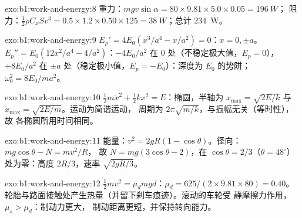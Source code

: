 \begin{solution}{exo:b1:work-and-energy:8}
重力：$mgv\sin\alpha = 80 \times 9.81 \times 5.0 \times 0.05 = \qty{196}{W}$；
阻力：$\tfrac12\rho C_xSv^3 = 0.5 \times 1.2 \times 0.50 \times 125 =
\qty{38}{W}$；总计 \qty{234}{W}。
\end{solution}

\begin{solution}{exo:b1:work-and-energy:9}
$E_p' = 4E_0(x^3/a^4 - x/a^2) = 0$：$x = 0, \pm a$。$E_p'' = E_0(12x^2/a^4 -
4/a^2)$：$-4E_0/a^2$ 在 $0$ 处（不稳定极大值，$E_p = 0$），$+8E_0/a^2$
在 $\pm a$ 处（稳定极小值，$E_p = -E_0$）：深度为 $E_0$ 的势阱；
$\omega_0^2 = 8E_0/ma^2$。
\end{solution}

\begin{solution}{exo:b1:work-and-energy:10}
$\tfrac12 m\dot x^2 + \tfrac12 kx^2 = E$：椭圆，半轴为 $x_{\max}
= \sqrt{2E/k}$ 与 $\dot x_{\max} = \sqrt{2E/m}$。运动为简谐运动，
周期为 $2\pi\sqrt{m/k}$，与振幅无关（等时性），故
各椭圆所用时间相同。
\end{solution}

\begin{solution}{exo:b1:work-and-energy:11}
能量：$v^2 = 2gR(1 - \cos\theta)$。径向：$mg\cos\theta - N = mv^2/R$，
故 $N = mg(3\cos\theta - 2)$，在 $\cos\theta = 2/3$（$\theta =
48^\circ$）处为零：高度 $2R/3$，速率 $\sqrt{2gR/3}$。
\end{solution}

\begin{solution}{exo:b1:work-and-energy:12}
$\tfrac12 mv^2 = \mu_dmgd$：$\mu_d = 625/(2 \times 9.81 \times 80) = 0.40$。
轮胎与路面接触处产生热量（并留下刹车痕迹）。滚动的车轮受
静摩擦力作用，$\mu_s > \mu_d$：制动力更大，
制动距离更短，并保持转向能力。
\end{solution}

